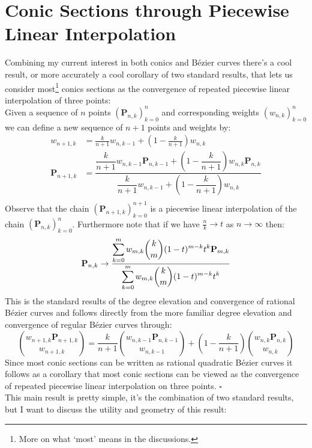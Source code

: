 
\section{Conic Sections through Piecewise Linear Interpolation}
Combining my current interest in both conics and Bézier curves there's a cool result,
or more accurately a cool corollary of two standard results,
that lets us consider most\footnote{More on what `most' means in the discussions.} conics sections as the convergence of repeated piecewise linear interpolation of three points:
\\

Given a sequence of $n$ points $(\mathbf{P}_{n,k})_{k=0}^n$ and corresponding weights $(w_{n,k})_{k=0}^n$ we can define a new sequence of $n+1$ points and weights by:
\[\begin{aligned}
	w_{n+1,k} &= \frac{k}{n+1}w_{n,k-1}+\left(1-\frac{k}{n+1}\right)w_{n,k}\\
	\mathbf{P}_{n+1,k} &= \dfrac{\dfrac{k}{n+1}w_{n,k-1}\mathbf{P}_{n,k-1}+\left(1-\dfrac{k}{n+1}\right)w_{n,k}\mathbf{P}_{n,k}}{\dfrac{k}{n+1}w_{n,k-1}+\left(1-\dfrac{k}{n+1}\right)w_{n,k}}\\
\end{aligned}\]
Observe that the chain $(\mathbf{P}_{n+1,k})_{k=0}^{n+1}$ is a piecewise linear interpolation of the chain $(\mathbf{P}_{n,k})_{k=0}^{n}$.
Furthermore note that if we have $\frac{n}{k}\rightarrow t$ as $n\rightarrow \infty$ then:
\[
	\mathbf{P}_{n,k}\rightarrow\dfrac{\displaystyle\sum_{k=0}^{m}w_{m,k}\binom{k}{m}(1-t)^{m-k}t^k\mathbf{P}_{m,k}}{\displaystyle\sum_{k=0}^{m}w_{m,k}\binom{k}{m}(1-t)^{m-k}t^k}\\
\]
This is the standard results of the degree elevation and convergence of rational Bézier curves and follows directly from the more familiar degree elevation and convergence of regular Bézier curves through:
\[
	\binom{w_{n+1,k}\mathbf{P}_{n+1,k}}{w_{n+1,k}}=\frac{k}{n+1}\binom{w_{n,k-1}\mathbf{P}_{n,k-1}}{w_{n,k-1}} + \left(1-\frac{k}{n+1}\right)\binom{w_{n,k}\mathbf{P}_{n,k}}{w_{n,k}}
\]
Since most conic sections can be written as rational quadratic Bézier curves it follows as a corollary that most conic sections can be viewed as the convergence of repeated piecewise linear interpolation on three points. $\square$
\\

This main result is pretty simple,
it's the combination of two standard results,
but I want to discuss the utility and geometry of this result:


